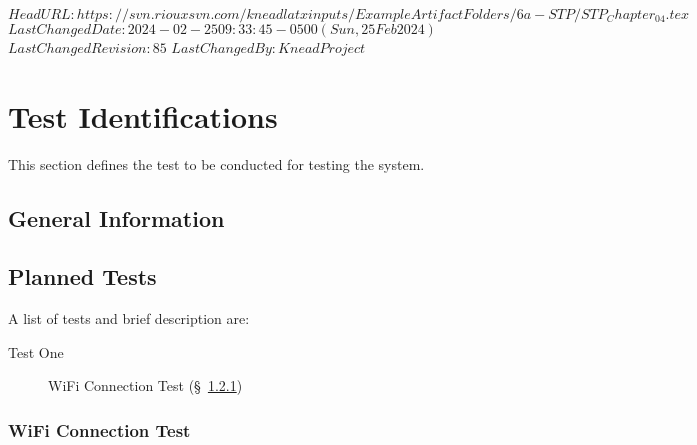\svnidlong
{$HeadURL: https://svn.riouxsvn.com/kneadlatxinputs/ExampleArtifactFolders/6a-STP/STP_Chapter_04.tex $}
{$LastChangedDate: 2024-02-25 09:33:45 -0500 (Sun, 25 Feb 2024) $}
{$LastChangedRevision: 85 $}
{$LastChangedBy: KneadProject $}


\chapter{Test Identifications}
\label{loc:TestIdentifications}
% 

This section defines the test to be conducted for testing the system.

\section{General Information}
\label{loc:TestGeneralInformation}



\section{Planned Tests}
\label{loc:TestGeneralInformation}
% 

A list of tests and brief description are:
\begin{description}
\item [Test One] WiFi Connection Test (\S~\ref{loc:TestIdOne})
\end{description}

\subsection{WiFi Connection Test}
\label{loc:TestIdOne}
\newcommand{\TestIdName}{WiFi Test}%


% 

